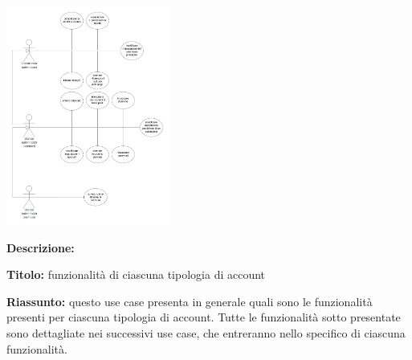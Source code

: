 \begin{listaPersonale}[UC]{}
    \begin{center}
        \includegraphics[width=0.4\textwidth]{img/Diagrammi/UseCases/FunzionalitaUtenti.png}
    \end{center}

    \textbf{Descrizione:}

    \textbf{Titolo:} funzionalità di ciascuna tipologia di account

    \textbf{Riassunto:} questo use case presenta in generale quali sono le funzionalità presenti per ciascuna tipologia di account. Tutte le funzionalità sotto presentate sono dettagliate nei successivi use case, che entreranno nello specifico di ciascuna funzionalità.


\end{listaPersonale}
